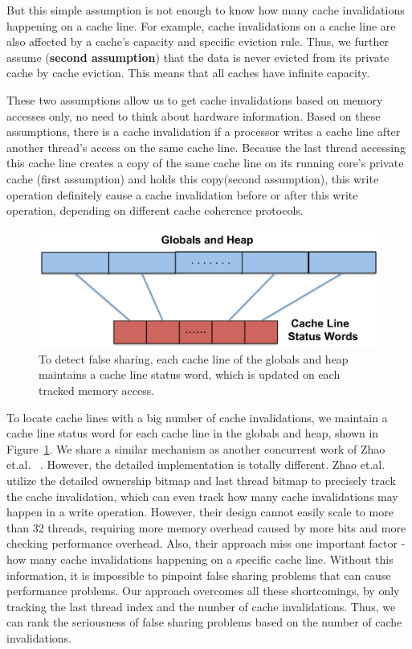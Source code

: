 But this simple assumption is not enough to know how many cache invalidations happening on a cache line. For example, cache invalidations on a cache line are also affected by a cache's capacity and specific eviction rule. Thus, we further assume (\textbf{second assumption}) that the data is never evicted from its private cache by cache eviction. This means that all caches have infinite capacity. 

These two assumptions allow us to get cache invalidations based on memory accesses only, no need to think about hardware information. Based on these assumptions, there is a cache invalidation if a processor writes a cache line after another thread's access on the same cache line. Because the last thread accessing this cache line creates a copy of the same cache line on its running core's private cache (first assumption) and  holds this copy(second assumption), this write operation definitely cause a cache invalidation before or after this write operation, depending on different cache coherence protocols. 


\begin{figure}[!t]
\centering
\includegraphics[width=6in]{fig/cachelinestatuswords}
\caption{
To detect false sharing, each cache line of the globals and heap maintains a cache line status word, which is updated on each tracked memory access. \label{fig:cachelinestatusword}}
\end{figure}


To locate cache lines with a big number of cache invalidations, we maintain a cache line status word for each cache line in the globals and heap, shown in Figure~\ref{fig:cachelinestatusword}. We share a similar mechanism as another concurrent work of Zhao et.al. ~\cite{qinzhao}. 
However, the detailed implementation is totally different. Zhao et.al. utilize the detailed ownership bitmap and last thread bitmap to precisely track the cache invalidation, which can even track how many cache invalidations may happen in a write operation. However, their design cannot easily scale to more than 32 threads, requiring more memory overhead caused by more bits and more checking performance overhead. Also, their approach miss one important factor - how many cache invalidations happening on a specific cache line. Without this information, it is impossible to pinpoint false sharing problems that can cause performance problems.   
Our approach overcomes all these shortcomings, by only tracking the last thread index and the number of cache invalidations. Thus, we can rank the seriousness of false sharing problems based on the number of cache invalidations. 

